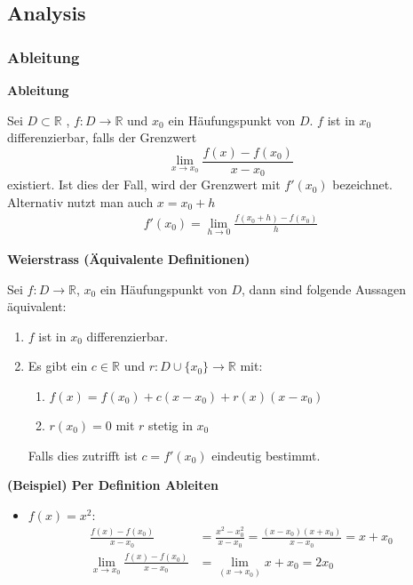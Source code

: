 \documentclass[25pt]{sciposter}
\newcommand{\R}{\mathbb{R}}
\newenvironment{method}[1]{\begin{mdframed}[backgroundcolor=blue!10,innertopmargin=15pt, innerbottommargin=15pt,nobreak=true]
		\textbf{#1 }
	}
	{ 
	\end{mdframed}
}
\begin{document}
\begin{multicols}{3}
\part{Analysis}

\section{Ableitung}

\begin{method}{Ableitung}
	Sei $D \subset \R$ , $f:D \to  \R$ und $x_0$ ein Häufungspunkt von $D$. $f$ ist in $x_0$ differenzierbar, falls der Grenzwert 
	$$ \lim\limits_{x \to x_0} \frac{f(x) -f(x_0)}{x-x_0}$$
	existiert. Ist dies der Fall, wird der Grenzwert mit $f'(x_0)$ bezeichnet.\\
	Alternativ nutzt man auch $x = x_0 + h$
	\begin{align*}
			f'(x_0) = \lim\limits_{h \to 0} \frac{f(x_0 + h) - f(x_0)}{h}
	\end{align*}
\end{method}


\begin{method}{Weierstrass (Äquivalente Definitionen)}
Sei $f : D \to \R$, $x_0$ ein Häufungspunkt von $D$, dann sind folgende Aussagen äquivalent:
\begin{enumerate}
	\item $f$ ist in $x_0$ differenzierbar.
	\item Es gibt ein $c\in \R$ und $r : D \cup \{x_0\} \to \R$ mit:
	\begin{enumerate}
		\item $f(x) = f(x_0) + c(x-x_0) + r(x) (x-x_0)$
		\item $r(x_0) = 0$ mit $r$ stetig in $x_0$
	\end{enumerate}
Falls dies zutrifft ist $c=f'(x_0)$ eindeutig bestimmt.
\end{enumerate}
\end{method}

\textbf{(Beispiel) Per Definition Ableiten}

\begin{itemize}
	\item $f(x) = x^2$:
	\begin{align*}
		\frac{f(x) - f(x_0)}{x-x_0} &= 	\frac{x^2 - x_{0}^2}{x-x_0} = \frac{(x-x_0) (x+x_0)}{x-x_0} = x + x_0\\
		\lim_{x \to x_0} \frac{f(x)-f(x_0)}{x-x_0} &= \lim_{(x\to x_0)} x + x_0 = 2x_0
	\end{align*}
\end{itemize}




\end{multicols}
\end{document}
